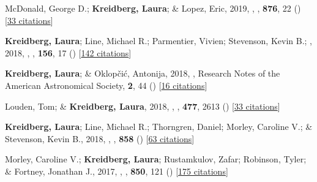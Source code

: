 \item[{\color{numcolor}\scriptsize14}] McDonald, George D.; \textbf{Kreidberg, Laura}; \& Lopez, Eric, 2019, , \apj, \textbf{876}, 22 () [\href{https://ui.adsabs.harvard.edu/abs/2019ApJ...876...22M}{33 citations}]

\item[{\color{numcolor}\scriptsize13}] \textbf{Kreidberg, Laura}; Line, Michael R.; Parmentier, Vivien; Stevenson, Kevin B.; \etal, 2018, , \aj, \textbf{156}, 17 () [\href{https://ui.adsabs.harvard.edu/abs/2018AJ....156...17K}{142 citations}]

\item[{\color{numcolor}\scriptsize12}] \textbf{Kreidberg, Laura}; \& Oklop{\v{c}}i{\'c}, Antonija, 2018, , Research Notes of the American Astronomical Society, \textbf{2}, 44 () [\href{https://ui.adsabs.harvard.edu/abs/2018RNAAS...2...44K}{16 citations}]

\item[{\color{numcolor}\scriptsize11}] Louden, Tom; \& \textbf{Kreidberg, Laura}, 2018, , \mnras, \textbf{477}, 2613 () [\href{https://ui.adsabs.harvard.edu/abs/2018MNRAS.477.2613L}{33 citations}]

\item[{\color{numcolor}\scriptsize10}] \textbf{Kreidberg, Laura}; Line, Michael R.; Thorngren, Daniel; Morley, Caroline V.; \& Stevenson, Kevin B., 2018, , \apj, \textbf{858} () [\href{https://ui.adsabs.harvard.edu/abs/2018ApJ...858L...6K}{63 citations}]

\item[{\color{numcolor}\scriptsize9}] Morley, Caroline V.; \textbf{Kreidberg, Laura}; Rustamkulov, Zafar; Robinson, Tyler; \& Fortney, Jonathan J., 2017, , \apj, \textbf{850}, 121 () [\href{https://ui.adsabs.harvard.edu/abs/2017ApJ...850..121M}{175 citations}]

